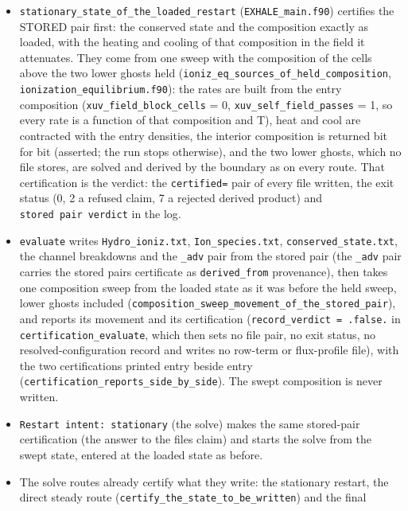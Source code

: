 \documentclass[english,a4paper]{my_memo}
\providecommand{\tightlist}{\setlength{\itemsep}{0pt}\setlength{\parskip}{0pt}}
\begin{document}
\begin{itemize}
\tightlist
\item
  \texttt{stationary\_state\_of\_the\_loaded\_restart} (\texttt{EXHALE\_main.f90}) certifies the
  STORED pair first: the conserved state and the composition exactly as
  loaded, with the heating and cooling of that composition in the field it
  attenuates. They come from one sweep with the composition of the cells
  above the two lower ghosts held (\texttt{ioniz\_eq\_sources\_of\_held\_composition},
  \texttt{ionization\_equilibrium.f90}): the rates are built from the entry
  composition (\texttt{xuv\_field\_block\_cells} = 0, \texttt{xuv\_self\_field\_passes} = 1, so
  every rate is a function of that composition and T), heat and cool are
  contracted with the entry densities, the interior composition is returned
  bit for bit (asserted; the run stops otherwise), and the two lower ghosts,
  which no file stores, are solved and derived by the boundary as on every
  route. That certification is the verdict: the \texttt{certified=} pair of every
  file written, the exit status (0, 2 a refused claim, 7 a rejected derived
  product) and \texttt{stored\ pair\ verdict} in the log.
\item
  \texttt{evaluate} writes \texttt{Hydro\_ioniz.txt}, \texttt{Ion\_species.txt},
  \texttt{conserved\_state.txt}, the channel breakdowns and the \texttt{\_adv} pair from the
  stored pair (the \texttt{\_adv} pair carries the stored pair\textquotesingle s certificate as
  \texttt{derived\_from} provenance), then takes one composition sweep from the
  loaded state as it was before the held sweep, lower ghosts included
  (\texttt{composition\_sweep\_movement\_of\_the\_stored\_pair}), and reports
  its movement and its certification (\texttt{record\_verdict\ =\ .false.} in
  \texttt{certification\_evaluate}, which then sets no file pair, no exit status, no
  resolved-configuration record and writes no row-term or flux-profile file),
  with the two certifications printed entry beside entry
  (\texttt{certification\_reports\_side\_by\_side}). The swept composition is never
  written.
\item
  \texttt{Restart\ intent:\ stationary} (the solve) makes the same stored-pair
  certification (the answer to the file\textquotesingle s claim) and starts the solve from
  the swept state, entered at the loaded state as before.
\item
  The solve routes already certify what they write: the stationary restart,
  the direct steady route (\texttt{certify\_the\_state\_to\_be\_written}) and the final

\end{itemize}
\end{document}
